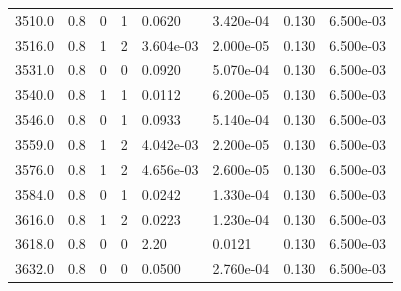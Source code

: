 \documentclass[preview]{standalone}
\begin{document}
{{{{{{{\begin{tabular}{L{1.2cm}C{1.2cm} C{0.3cm}C{0.5cm} C{1.4cm}C{1.4cm} C{1.4cm}C{1.4cm}}
  3510.0  &   0.8  & 0     &  1 &  0.0620  & 3.420e-04  & 0.130 &  6.500e-03   \\ 
  3516.0  &   0.8  & 1     &  2 &  3.604e-03  & 2.000e-05  & 0.130 &  6.500e-03   \\ 
  3531.0  &   0.8  & 0     &  0 &  0.0920  & 5.070e-04  & 0.130 &  6.500e-03   \\ 
  3540.0  &   0.8  & 1     &  1 &  0.0112  & 6.200e-05  & 0.130 &  6.500e-03   \\ 
  3546.0  &   0.8  & 0     &  1 &  0.0933  & 5.140e-04  & 0.130 &  6.500e-03   \\ 
  3559.0  &   0.8  & 1     &  2 &  4.042e-03  & 2.200e-05  & 0.130 &  6.500e-03   \\ 
  3576.0  &   0.8  & 1     &  2 &  4.656e-03  & 2.600e-05  & 0.130 &  6.500e-03   \\ 
  3584.0  &   0.8  & 0     &  1 &  0.0242  & 1.330e-04  & 0.130 &  6.500e-03   \\ 
  3616.0  &   0.8  & 1     &  2 &  0.0223  & 1.230e-04  & 0.130 &  6.500e-03   \\ 
  3618.0  &   0.8  & 0     &  0 &  2.20  & 0.0121  & 0.130 &  6.500e-03   \\ 
  3632.0  &   0.8  & 0     &  0 &  0.0500  & 2.760e-04  & 0.130 &  6.500e-03   \\ 
\hline 
\end{tabular} 

}}}}}}}
\end{document}
